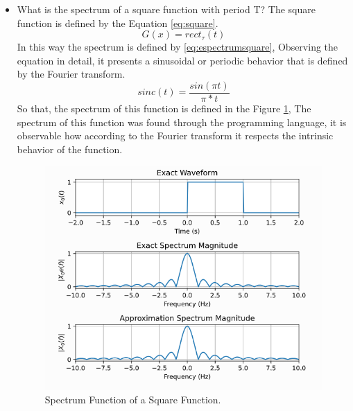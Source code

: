 \documentclass[12pt, twoside]{report}
\begin{document}
\begin{itemize}
    \item What is the spectrum of a square function with period T?
    The square function is defined by the Equation \ref{eq:square}.
    \begin{equation}
        G(x)=rect_{\tau} (t)
        \label{eq:square}
    \end{equation}
    In this way the spectrum is defined by \ref{eq:espectrumsquare}, Observing the equation in detail, it presents a sinusoidal or periodic behavior that is defined by the Fourier transform.
    \begin{equation}
        sinc(t)=\dfrac{ sin(\pi t)}{\pi * t}
        \label{eq:espectrumsquare}
    \end{equation}
    So that, the spectrum of this function is defined in the Figure \ref{fig:squarespec}, The spectrum of this function was found through the programming language, it is observable how according to the Fourier transform it respects the intrinsic behavior of the function.
    \begin{figure}[!h]
    \centering
  \includegraphics[scale=0.6]{images/squarespectrum.png}
  \caption{Spectrum Function of a Square Function.}
  \label{fig:squarespec}
    \end{figure}
    

\end{itemize}
\end{document}
